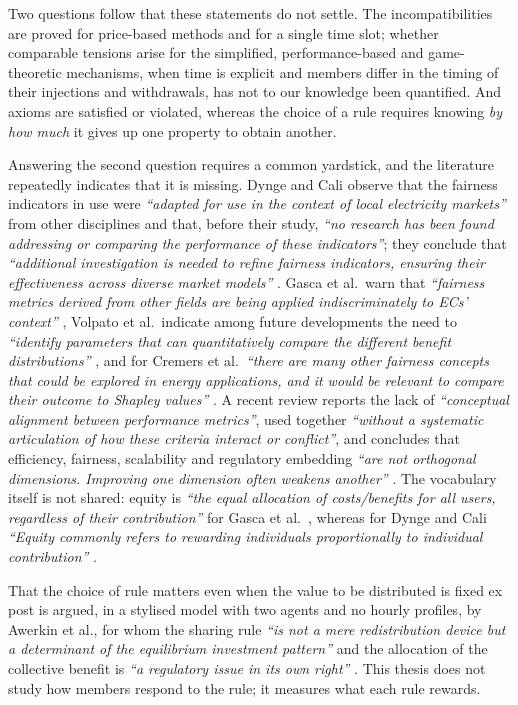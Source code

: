 Two questions follow that these statements do not settle. The incompatibilities are proved for price-based methods and for a single time slot; whether comparable tensions arise for the simplified, performance-based and game-theoretic mechanisms, when time is explicit and members differ in the timing of their injections and withdrawals, has not to our knowledge been quantified. And axioms are satisfied or violated, whereas the choice of a rule requires knowing \emph{by how much} it gives up one property to obtain another.

Answering the second question requires a common yardstick, and the literature repeatedly indicates that it is missing. Dynge and Cali observe that the fairness indicators in use were \textit{``adapted for use in the context of local electricity markets''} from other disciplines and that, before their study, \textit{``no research has been found addressing or comparing the performance of these indicators''}; they conclude that \textit{``additional investigation is needed to refine fairness indicators, ensuring their effectiveness across diverse market models''} \cite{dynge2025}. Gasca et al.\ warn that \textit{``fairness metrics derived from other fields are being applied indiscriminately to ECs' context''} \cite{gasca2024}, Volpato et al.\ indicate among future developments the need to \textit{``identify parameters that can quantitatively compare the different benefit distributions''} \cite{volpato2024}, and for Cremers et al.\ \textit{``there are many other fairness concepts that could be explored in energy applications, and it would be relevant to compare their outcome to Shapley values''} \cite{cremers2023}. A recent review reports the lack of \textit{``conceptual alignment between performance metrics''}, used together \textit{``without a systematic articulation of how these criteria interact or conflict''}, and concludes that efficiency, fairness, scalability and regulatory embedding \textit{``are not orthogonal dimensions. Improving one dimension often weakens another''} \cite{chatel2026}. The vocabulary itself is not shared: equity is \textit{``the equal allocation of costs/benefits for all users, regardless of their contribution''} for Gasca et al.\ \cite{gasca2024}, whereas for Dynge and Cali \textit{``Equity commonly refers to rewarding individuals proportionally to individual contribution''} \cite{dynge2025}.

That the choice of rule matters even when the value to be distributed is fixed ex post is argued, in a stylised model with two agents and no hourly profiles, by Awerkin et al., for whom the sharing rule \textit{``is not a mere redistribution device but a determinant of the equilibrium investment pattern''} and the allocation of the collective benefit is \textit{``a regulatory issue in its own right''} \cite{awerkin2026}. This thesis does not study how members respond to the rule; it measures what each rule rewards.

